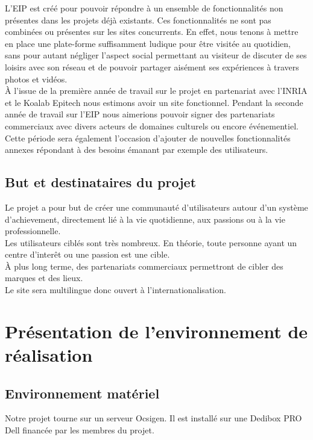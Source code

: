 \documentclass{life-fr}
\begin{document}
L'EIP est créé pour pouvoir répondre à un ensemble de fonctionnalités non présentes dans les projets déjà existants. Ces fonctionnalités ne sont pas combinées ou présentes sur les sites concurrents. En effet, nous tenons à mettre en place une plate-forme suffisamment ludique pour être visitée au quotidien, sans pour autant négliger l’aspect social permettant au visiteur de discuter de ses loisirs avec son réseau et de pouvoir partager aisément ses expériences à travers photos et vidéos.\\

À l'issue de la première année de travail sur le projet en partenariat avec l'INRIA et le Koalab Epitech nous estimons avoir un site fonctionnel. Pendant la seconde année de travail sur l'EIP nous aimerions pouvoir signer des partenariats commerciaux avec divers acteurs de domaines culturels ou encore événementiel. Cette période sera également l'occasion d'ajouter de nouvelles fonctionnalités annexes répondant à des besoins émanant par exemple des utilisateurs.

\section{But et destinataires du projet}

Le projet a pour but de créer une communauté d'utilisateurs autour d'un système d'achievement, directement lié à la vie quotidienne, aux passions ou à la vie professionnelle.\\

Les utilisateurs ciblés sont très nombreux. En théorie, toute personne ayant un centre d'interêt ou une passion est une cible.\\

À plus long terme, des partenariats commerciaux permettront de cibler des marques et des lieux.\\

Le site sera multilingue donc ouvert à l'internationalisation.

\chapter{Présentation de l’environnement de réalisation}

\section{Environnement matériel}

Notre projet tourne sur un serveur Ocsigen. Il est installé sur une Dedibox PRO Dell financée par les membres du projet.
\end{document}
